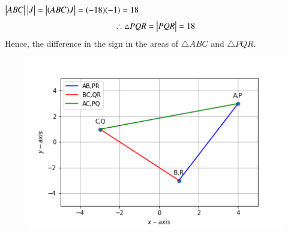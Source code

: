 \documentclass[journal,12pt,twocolumn]{IEEEtran}
\renewcommand\thesection{\arabic{section}}
\begin{document}
\begin{enumerate}[label=\thesection.\arabic*.,ref=\thesection.\theenumi]
$\begin{vmatrix}ABC\end{vmatrix}\begin{vmatrix}J\end{vmatrix}=\begin{vmatrix}(ABC)J\end{vmatrix}=(-18)(-1)=18$
\label{eq:area_pqr}
\begin{align}
\therefore\triangle PQR=\begin{vmatrix}PQR\end{vmatrix}=18
\end{align}
Hence, the difference in the sign in the areas of $\triangle ABC$ and $\triangle PQR$.
\begin{figure}[!ht]
	\centering
	\includegraphics[scale=0.48]{triangle.png}
\end{figure}
\end{enumerate}
\end{document}

